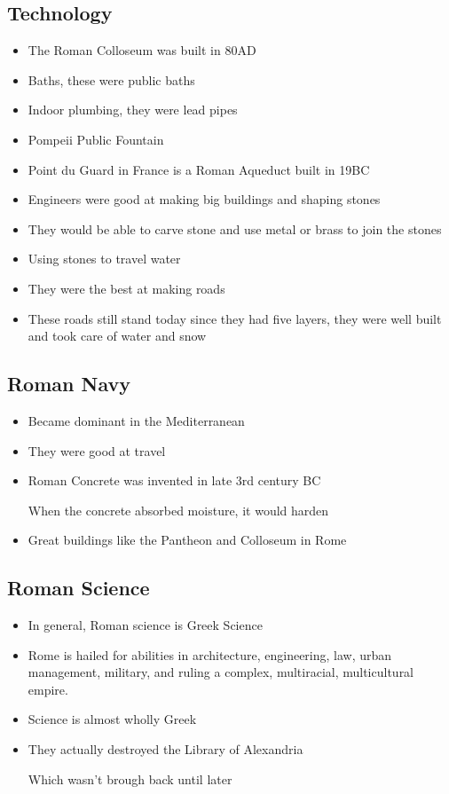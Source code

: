 \documentclass{article}
\begin{document}
\subsection{Technology}
\begin{itemize}
  \item The Roman Colloseum was built in 80AD
  \item Baths, these were public baths
  \item Indoor plumbing, they were lead pipes
  \item Pompeii Public Fountain
  \item Point du Guard in France is a Roman Aqueduct built in 19BC
  \item Engineers were good at making big buildings and shaping stones
  \item They would be able to carve stone and use metal or brass to join the stones
  \item Using stones to travel water
  \item They were the best at making roads
  \item These roads still stand today since they had five layers,
    they were well built and took care of water and snow
\end{itemize}

\subsection{Roman Navy}
\begin{itemize}
  \item Became dominant in the Mediterranean
  \item They were good at travel
  \item Roman Concrete was invented in late 3rd century BC

    When the concrete absorbed moisture, it would harden
  \item Great buildings like the Pantheon and Colloseum in Rome
\end{itemize}

\subsection{Roman Science}
\begin{itemize}
  \item In general, Roman science is Greek Science
  \item Rome is hailed for abilities in architecture, engineering, law, urban management,  military,
    and ruling a complex, multiracial, multicultural empire.
  \item Science is almost wholly Greek
  \item They actually destroyed the Library of Alexandria

    Which wasn't brough back until later
\end{itemize}
\end{document}
